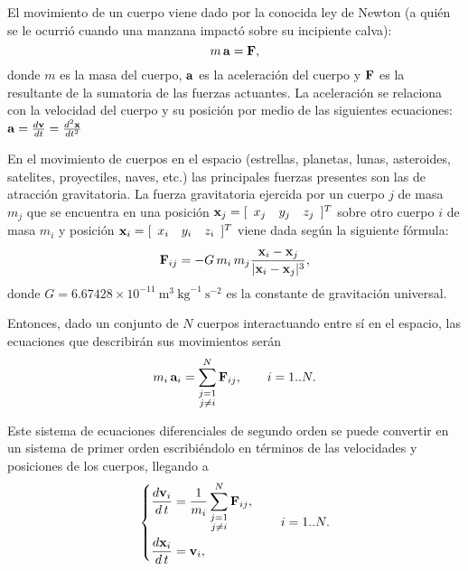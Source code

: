 El movimiento de un cuerpo viene dado por la conocida ley de Newton (a quién se le ocurrió cuando una manzana impactó sobre su incipiente calva):
\begin{equation*}
 m \, {\bf a} = {\bf F},
\end{equation*}
donde $m$ es la masa del cuerpo, ${\bf a}$ es la aceleración del cuerpo y ${\bf F}$ es la resultante de la sumatoria de las fuerzas actuantes. La aceleración se relaciona con la velocidad del cuerpo y su posición por medio de las siguientes ecuaciones: ${\bf a} = \frac {d{\bf {v}}}{dt} = \frac {d^2 {\bf {x}}}{dt^2}$

En el movimiento de cuerpos en el espacio (estrellas, planetas, lunas, asteroides, satelites, proyectiles, naves, etc.) las principales fuerzas presentes son las de atracción gravitatoria. La fuerza gravitatoria ejercida por un cuerpo $j$ de masa $m_j$ que se encuentra en una posición ${\bf x}_j = [\begin{array}{ccc} x_j & y_j & z_j \end{array}]^T$ sobre otro cuerpo $i$ de masa $m_i$ y posición ${\bf x}_i = [\begin{array}{ccc} x_i & y_i & z_i \end{array}]^T$ viene dada según la siguiente fórmula:
\begin{equation*}
 {\bf F}_{ij} = -G \, m_i \, m_j \frac{{\bf x}_i-{\bf x}_j}{\lvert {\bf x}_i-{\bf x}_j \rvert^3},
\end{equation*}
donde $G = 6.67428 \times 10^{-11} \ \mbox{m}^3 \ \mbox{kg}^{-1} \ \mbox{s}^{-2}$ es la constante de gravitación universal.

Entonces, dado un conjunto de $N$ cuerpos interactuando entre sí en el espacio, las ecuaciones que describirán sus movimientos serán
\begin{equation*}
 m_i \, {\bf a}_i = \sum_{\substack{j=1 \\ j \neq i}}^N {\bf F}_{ij}, \qquad i = 1..N.
\end{equation*}

Este sistema de ecuaciones diferenciales de segundo orden se puede convertir en un sistema de primer orden escribiéndolo en términos de las velocidades y posiciones de los cuerpos, llegando a
\begin{equation}
\left\lbrace
\begin{aligned}
\frac{d{\bf v}_i}{d\,t} &= \frac{1}{m_i}\sum_{\substack{j=1 \\ j \neq i}}^N {\bf F}_{ij},\\
\frac{d{\bf x}_i}{d\,t} &= {\bf v}_i,
\end{aligned}
\right.
\qquad i = 1..N.
 \label{Sist1stOrd}
\end{equation}


